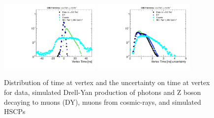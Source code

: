 \begin{figure}
  \begin{center}
      \includegraphics[width=0.44\textwidth]{figures/timing/Vertex}
      \includegraphics[width=0.44\textwidth]{figures/timing/VertexErr} \\
      \caption[Distribution of time at vertex and the uncertainty on time at vertex]
     {Distribution of time at vertex and the uncertainty on time at vertex for data,
simulated Drell-Yan production of photons and Z boson decaying to muons (DY), muons from cosmic-rays, and simulated HSCPs
}
      \label{fig:vertextime}
  \end{center}
\end{figure}



